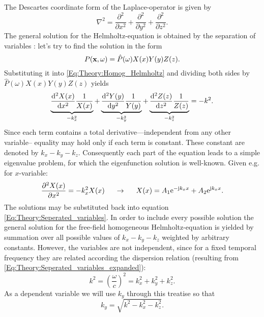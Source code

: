 The Descartes coordinate form of the Laplace-operator is given by
\begin{equation}
\nabla^2 = \frac{\partial^2}{\partial x^2} + \frac{\partial^2}{\partial y^2} +  \frac{\partial^2}{\partial z^2}.
\end{equation}
The general solution for the Helmholtz-equation is obtained by the separation of variables \cite{Devaney2012}: let's try to find the solution in the form
\begin{equation}
P(\mathbf{x},\omega) = \hat{P}(\omega) X(x)Y(y)Z(z).
\label{Eq:Theory:Seperated_variables}
\end{equation}
Substituting it into \eqref{Eq:Theory:Homog_Helmholtz} and dividing both sides by $\hat{P}(\omega) X(x)Y(y)Z(z)$ yields
\begin{equation}
\underbrace{\frac{\mathrm{d}^2 X(x)}{\mathrm{d} x^2}\frac{1}{X(x)}}_{-k_x^2} + 
\underbrace{\frac{\mathrm{d}^2 Y(y)}{\mathrm{d} y^2}\frac{1}{Y(y)}}_{-k_y^2} + 
\underbrace{\frac{\mathrm{d}^2 Z(z)}{\mathrm{d} z^2}\frac{1}{Z(z)}}_{-k_z^2}
= - k^2.
\label{Eq:Theory:Seperated_variables_expanded}
\end{equation}
Since each term contains a total derivative---independent from any other variable-- equality may hold only if each term is constant. These constant are denoted by $k_x-k_y-k_z$. Consequently each part of the equation leads to a simple eigenvalue problem, for which the eigenfunction solution is well-known. Given e.g. for $x$-variable:
\begin{equation}
\frac{\partial^2 X(x)}{\partial x^2} = -k_x^2 X(x) \hspace{5mm} \rightarrow \hspace{5mm} X(x) = A_1 \mathrm{e}^{-\mathrm{j} k_x x} + A_2 \mathrm{e}^{\mathrm{j} k_x x}.
\end{equation}
The solutions may be substituted back into equation \eqref{Eq:Theory:Seperated_variables}. In order to include every possible solution the general solution for the free-field homogeneous Helmholtz-equation is yielded by summation over all possible values of $k_x-k_y-k_z$ weighted by arbitrary constants. However, the variables are not independent, since for a fixed temporal frequency they are related according the dispersion relation
(resulting from \eqref{Eq:Theory:Seperated_variables_expanded}):
\begin{equation}
k^2 = \left( \frac{\omega}{c} \right)^2 = k_x^2 + k_y^2 + k_z^2.
\end{equation}
As a dependent variable we will use $k_y$ through this treatise so that
\begin{equation}
k_y = \sqrt{ k^2 - k_x^2 - k_z^2 }.
\end{equation}
